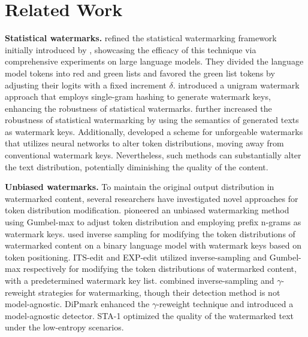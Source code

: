 \section{Related Work}
\textbf{Statistical watermarks.} \citet{kirchenbauer2023watermark} refined the statistical watermarking framework initially introduced by \citet{Aaronson2022}, showcasing the efficacy of this technique via comprehensive experiments on large language models. They divided the language model tokens into red and green lists and favored the green list tokens by adjusting their logits with a fixed increment $\delta$. \citet{zhao2023provable} introduced a unigram watermark approach that employs single-gram hashing to generate watermark keys, enhancing the robustness of statistical watermarks. \citet{liu2023semantic} further increased the robustness of statistical watermarking by using the semantics of generated texts as watermark keys. Additionally, \citet{liu2023unforgeable} developed a scheme for unforgeable watermarks that utilizes neural networks to alter token distributions, moving away from conventional watermark keys. Nevertheless, such methods can substantially alter the text distribution, potentially diminishing the quality of the content.

\noindent\textbf{Unbiased watermarks.} To maintain the original output distribution in watermarked content, several researchers have investigated novel approaches for token distribution modification. \citet{Aaronson2022} pioneered an unbiased watermarking method using Gumbel-max to adjust token distribution and employing prefix n-grams as watermark keys. \citet{christ2023undetectable} used inverse sampling for modifying the token distributions of watermarked content on a binary language model with watermark keys based on token positioning. ITS-edit and EXP-edit \cite{kuditipudi2023robust} utilized inverse-sampling and Gumbel-max respectively for modifying the token distributions of watermarked content, with a predetermined watermark key list. \citet{hu2023unbiased} combined inverse-sampling and $\gamma$-reweight strategies for watermarking, though their detection method is not model-agnostic. DiPmark \cite{wu2023dipmark} enhanced the $\gamma$-reweight technique and introduced a model-agnostic detector. STA-1 \cite{mao2024watermark} optimized the quality of the watermarked text under the low-entropy scenarios.